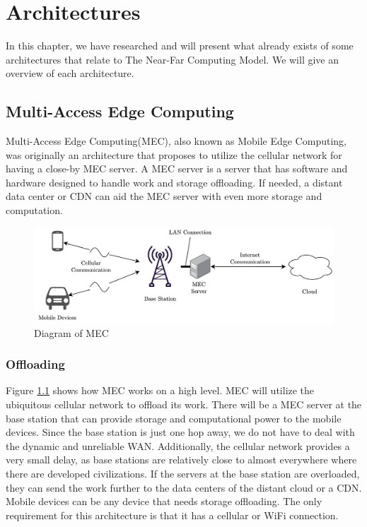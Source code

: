 \chapter{Architectures}\label{chapter:architectures} 
In this chapter, we have researched and will present what already exists of some architectures that relate to The Near-Far Computing Model. We will give an overview of each architecture.




\section{Multi-Access Edge Computing}\label{section:MEC_architecture}
Multi-Access Edge Computing(MEC), also known as Mobile Edge Computing, was originally an architecture that proposes to utilize the cellular network for having a close-by MEC server\cite{porambage_survey_2018}. A MEC server is a server that has software and hardware designed to handle work and storage offloading. If needed, a distant data center or CDN can aid the MEC server with even more storage and computation.
\begin{figure}[t]
    \centering
    \includegraphics[scale=0.75]{chapters/4_architectures/figures/MEC.png}
    \caption{Diagram of MEC}
    \label{fig:MEC}
\end{figure}

\subsection{Offloading}
Figure \ref{fig:MEC} shows how MEC works on a high level. MEC will utilize the ubiquitous cellular network to offload its work. There will be a MEC server at the base station that can provide storage and computational power to the mobile devices. Since the base station is just one hop away, we do not have to deal with the dynamic and unreliable WAN. Additionally, the cellular network provides a very small delay, as base stations are relatively close to almost everywhere where there are developed civilizations. If the servers at the base station are overloaded, they can send the work further to the data centers of the distant cloud or a CDN. Mobile devices can be any device that needs storage offloading. The only requirement for this architecture is that it has a cellular or WiFi connection.

